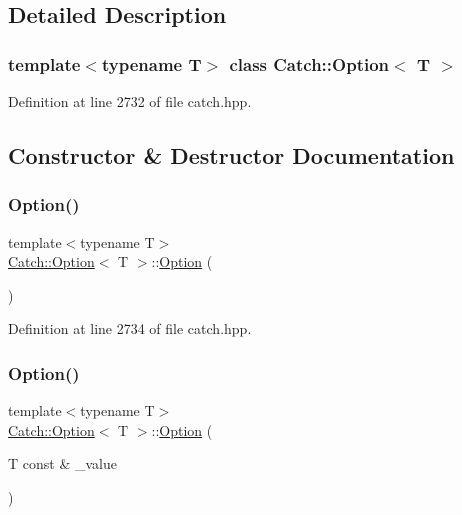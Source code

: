 \subsection{Detailed Description}
\subsubsection*{template$<$typename T$>$\newline
class Catch\+::\+Option$<$ T $>$}



Definition at line 2732 of file catch.\+hpp.



\subsection{Constructor \& Destructor Documentation}
\hypertarget{class_catch_1_1_option_a8efb01b593d798decc80cbbdf311f2a3}{}\label{class_catch_1_1_option_a8efb01b593d798decc80cbbdf311f2a3} 
\subsubsection{\texorpdfstring{Option()}{Option()}\hspace{0.1cm}{\footnotesize\ttfamily [1/3]}}
{\footnotesize\ttfamily template$<$typename T$>$ \\
\hyperlink{class_catch_1_1_option}{Catch\+::\+Option}$<$ T $>$\+::\hyperlink{class_catch_1_1_option}{Option} (\begin{DoxyParamCaption}{ }\end{DoxyParamCaption})\hspace{0.3cm}{\ttfamily [inline]}}



Definition at line 2734 of file catch.\+hpp.

\hypertarget{class_catch_1_1_option_a5aeb9c22d48a6882bdf5fb4730b06c86}{}\label{class_catch_1_1_option_a5aeb9c22d48a6882bdf5fb4730b06c86} 
\subsubsection{\texorpdfstring{Option()}{Option()}\hspace{0.1cm}{\footnotesize\ttfamily [2/3]}}
{\footnotesize\ttfamily template$<$typename T$>$ \\
\hyperlink{class_catch_1_1_option}{Catch\+::\+Option}$<$ T $>$\+::\hyperlink{class_catch_1_1_option}{Option} (\begin{DoxyParamCaption}\item[{T const \&}]{\+\_\+value }\end{DoxyParamCaption})\hspace{0.3cm}{\ttfamily [inline]}}



